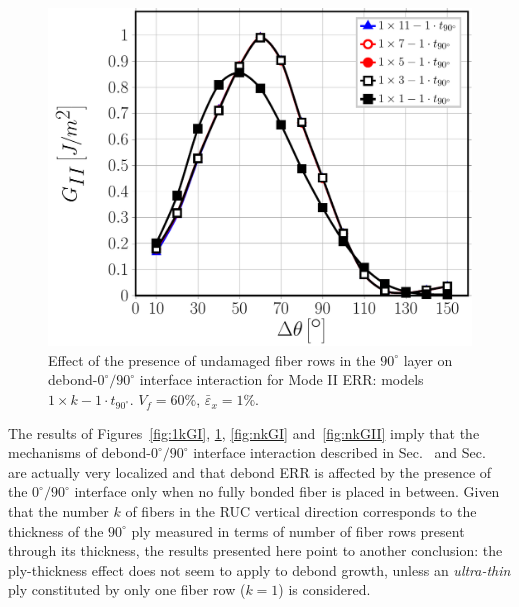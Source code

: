 \documentclass[Review,sagev,times]{sagej}
\begin{document}
\begin{figure}[!htb]
\centering
\includegraphics[height=0.375\textheight]{1xk-1-vf60-GII.pdf}
\caption{Effect of the presence of undamaged fiber rows in the $90^{\circ}$ layer on debond-$0^{\circ}/90^{\circ}$ interface interaction for Mode II ERR: models $1\times k-1\cdot t_{90^{\circ}}$. $V_{f}=60\%$, $\bar{\varepsilon}_{x}=1\%$.}\label{fig:1kGII}
\end{figure}

The results of Figures~\ref{fig:1kGI}, \ref{fig:1kGII}, \ref{fig:nkGI} and~\ref{fig:nkGII} imply that the mechanisms of debond-$0^{\circ}/90^{\circ}$ interface interaction described in Sec.~ and Sec.~ are actually very localized and that debond ERR is affected by the presence of the $0^{\circ}/90^{\circ}$ interface only when no fully bonded fiber is placed in between. Given that the number $k$ of fibers in the RUC vertical direction corresponds to the thickness of the $90^{\circ}$ ply measured in terms of number of fiber rows present through its thickness, the results presented here point to another conclusion: the ply-thickness effect does not seem to apply to debond growth, unless an \textit{ultra-thin} ply constituted by only one fiber row ($k=1$) is considered.\\
\end{document}
